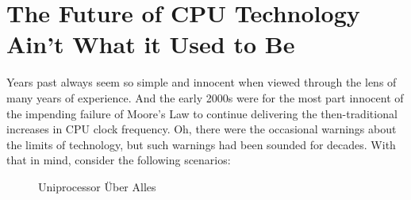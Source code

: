 
\section{The Future of CPU Technology Ain't What it Used to Be}
\label{sec:future:The Future of CPU Technology Ain't What it Used to Be}

Years past always seem so simple and innocent when viewed through the
lens of many years of experience.
And the early 2000s were for the most part innocent of the impending
failure of Moore's Law to continue delivering the then-traditional
increases in CPU clock frequency.
Oh, there were the occasional warnings about the limits of technology,
but such warnings had been sounded for decades.
With that in mind, consider the following scenarios:

\begin{figure}[tb]
\begin{center}
\end{center}
\caption{Uniprocessor \"Uber Alles}
\end{figure}

